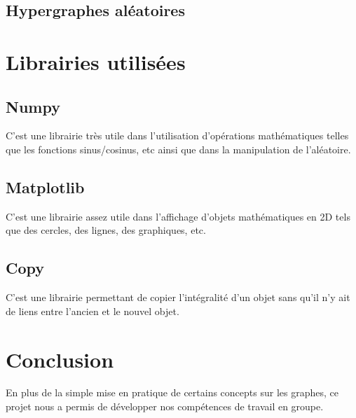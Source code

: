 \documentclass{article}
\begin{document}
	
	\subsection{Hypergraphes aléatoires}
	
\section{Librairies utilisées}

	\subsection{Numpy}
		C'est une librairie très utile dans l'utilisation d'opérations mathématiques telles que les fonctions sinus/cosinus, etc ainsi que dans la manipulation de l'aléatoire.

	\subsection{Matplotlib}
		C'est une librairie assez utile dans l'affichage d'objets mathématiques en 2D tels que des cercles, des lignes, des graphiques, etc.
	
	\subsection{Copy}
		C'est une librairie permettant de copier l'intégralité d'un objet sans qu'il n'y ait de liens entre l'ancien et le nouvel objet.

\section{Conclusion}
	En plus de la simple mise en pratique de certains concepts sur les graphes, ce projet nous a permis de développer nos compétences de travail en groupe.
\end{document}
